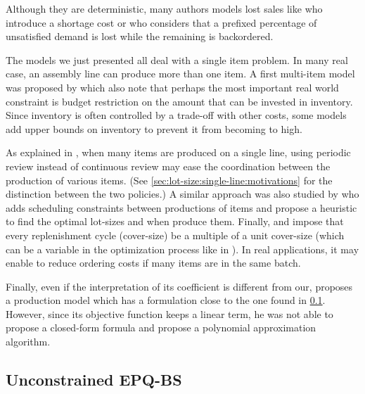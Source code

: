 Although they are deterministic, many authors models lost sales like \citet{Salameh2003} who introduce a shortage cost or \citet{Park1982} who considers that a prefixed percentage of unsatisfied demand is lost while the remaining is backordered.


\medskip


The models we just presented all deal with a single item problem.
In many real case, an assembly line can produce more than one item.
A first multi-item model was proposed by \citet{Hadley1963} which also note that perhaps the most important real world constraint is budget restriction on the amount that can be invested in inventory.
Since inventory is often controlled by a trade-off with other costs, some models add upper bounds on inventory to prevent it from becoming to high.


As explained in \citet{Eynan2007}, when many items are produced on a single line, using periodic review instead of continuous review may ease the coordination between the production of various items.
(See \cref{sec:lot-size:single-line:motivations} for the distinction between the two policies.)
A similar approach was also studied by \citet{Madigan1968} who adds scheduling constraints between productions of items and propose a heuristic to find the optimal lot-sizes and when produce them.
Finally, \citet{Bomberger1966} and \citet{Goyal1974} impose that every replenishment cycle (cover-size) be a multiple of a unit cover-size (which can be a variable in the optimization process like in \citet{Silver1976}).
In real applications, it may enable to reduce ordering costs if many items are in the same batch.


\medskip


Finally, even if the interpretation of its coefficient is different from our, \citet{Ziegler1982} proposes a production model which has a formulation close to the one found in \cref{sec:lot-size:single-line:models:unconstrained}.
However, since its objective function keeps a linear term, he was not able to propose a closed-form formula and propose a polynomial approximation algorithm.


\subsection{Unconstrained EPQ-BS}
\label{sec:lot-size:single-line:models:unconstrained}


